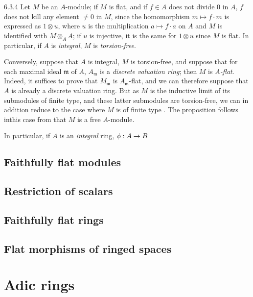 \begin{env}{6.3.4}
\label{env-0.6.3.4}
Let $M$ be an $A$-module; if $M$ is flat, and if $f\in A$ does not divide $0$ in $A$, $f$
does not kill any element $\neq 0$ in $M$, since the homomorphism $m\mapsto f\cdot m$ is
expressed as $1\otimes u$, where $u$ is the multiplication $a\mapsto f\cdot a$ on $A$ and
$M$ is identified with $M\otimes_A A$; if $u$ is injective, it is the same for $1\otimes u$
since $M$ is flat. In particular, if $A$ is \emph{integral}, $M$ is \emph{torsion-free}.

Conversely, suppose that $A$ is integral, $M$ is torsion-free, and suppose that for each
maximal ideal $\mathfrak{m}$ of $A$, $A_\mathfrak{m}$ is a \emph{discrete valuation ring};
then $M$ is \emph{$A$-flat}. Indeed, it suffices  to prove that
$M_\mathfrak{m}$ is $A_\mathfrak{m}$-flat, and we can therefore suppose that $A$ is already
a discrete valuation ring. But as $M$ is the inductive limit of its submodules of finite
type, and these latter submodules are torsion-free, we can in addition reduce to the case
where $M$ is of finite type . The proposition follows inthis case from
that $M$ is a free $A$-module.

In particular, if $A$ is an \emph{integral} ring, $\phi:A\to B$

\subsection{Faithfully flat modules}
\label{0-prelim-6.4}

\subsection{Restriction of scalars}
\label{0-prelim-6.5}

\subsection{Faithfully flat rings}
\label{0-prelim-6.6}

\subsection{Flat morphisms of ringed spaces}
\label{0-prelim-6.7}

\section{Adic rings}
\label{0-prelim-7}


\end{env}
